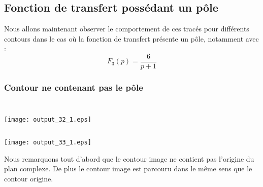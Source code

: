 \subsection{Fonction de transfert possédant un pôle}
Nous allons maintenant observer le comportement de ces tracés pour différents
contours dans le cas où la fonction de transfert présente un pôle,
notamment avec :
\[
F_3(p)=\dfrac{6}{p+1}
\] 
\subsubsection{Contour ne contenant pas le pôle}
\begin{tcolorbox}[breakable, size=fbox, boxrule=1pt, 
    pad at break*=1mm,colback=cellbackground, colframe=cellborder]
\inputminted{python}{codes/python/annexe_cauchy_cellule12.py}
\end{tcolorbox}
\begin{tcolorbox}[breakable, size=fbox, boxrule=1pt, 
    pad at break*=1mm,colback=cellbackground, colframe=cellborder]
\inputminted{python}{codes/python/annexe_cauchy_cellule13.py}
\end{tcolorbox}
\begin{center}
    \texttt{[image: output\_32\_1.eps]}
\end{center}
\begin{tcolorbox}[breakable, size=fbox, boxrule=1pt, 
    pad at break*=1mm,colback=cellbackground, colframe=cellborder]
\inputminted{python}{codes/python/annexe_cauchy_cellule14.py}
\end{tcolorbox}
\begin{center}
    \texttt{[image: output\_33\_1.eps]}
\end{center}
Nous remarquons tout d'abord que le contour image ne contient pas
l'origine du plan complexe. De plus le contour image est parcouru dans
le même sens que le contour origine. 
